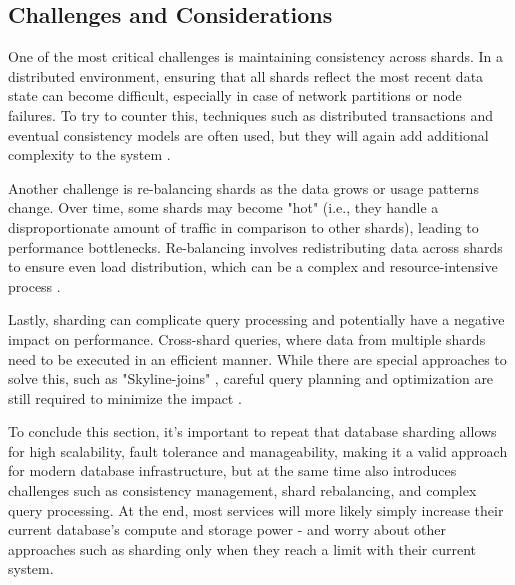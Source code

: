 \subsection{Challenges and Considerations}
One of the most critical challenges is maintaining consistency across shards. In a distributed environment, ensuring that all shards reflect the most recent data state can become difficult, especially in case of network partitions or node failures. To try to counter this, techniques such as distributed transactions and eventual consistency models are often used, but they will again add additional complexity to the system \cite{DBsharding}.

Another challenge is re-balancing shards as the data grows or usage patterns change. Over time, some shards may become "hot" (i.e., they handle a disproportionate amount of traffic in comparison to other shards), leading to performance bottlenecks. Re-balancing involves redistributing data across shards to ensure even load distribution, which can be a complex and resource-intensive process \cite{DatabaseSharding}.

Lastly, sharding can complicate query processing and potentially have a negative impact on performance. Cross-shard queries, where data from multiple shards need to be executed in an efficient manner. While there are special approaches to solve this, such as "Skyline-joins" \cite{skylinejoin}, careful query planning and optimization are still required to minimize the impact \cite{DatabaseSharding}.

To conclude this section, it's important to repeat that database sharding allows for high scalability, fault tolerance and manageability, making it a valid approach for modern database infrastructure, but at the same time also introduces challenges such as consistency management, shard rebalancing, and complex query processing. At the end, most services will more likely simply increase their current database's compute and storage power - and worry about other approaches such as sharding only when they reach a limit with their current system.  

% 
% 


